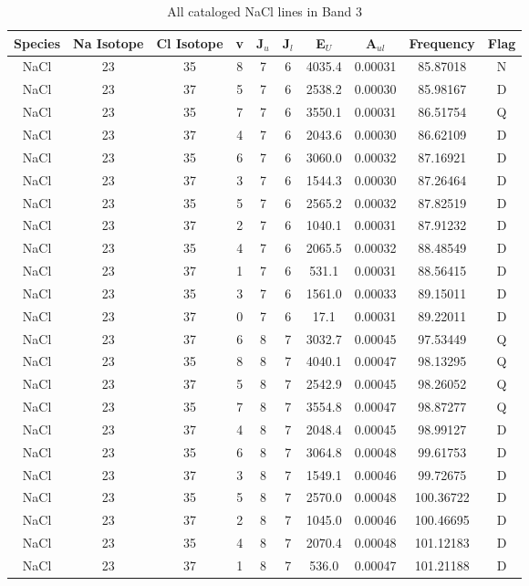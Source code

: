 \begin{table*}[htp]
\centering
\caption{All cataloged NaCl lines in Band 3}
\begin{tabular}{cccccccccc}
\label{tab:Na_detections_B3}
Species & Na Isotope & Cl Isotope & v & J$_u$ & J$_l$ & E$_U$ & A$_{ul}$ & Frequency & Flag \\
\hline
NaCl & 23 & 35 & 8 & 7 & 6 & 4035.4 & 0.00031 & 85.87018 & N \\
NaCl & 23 & 37 & 5 & 7 & 6 & 2538.2 & 0.00030 & 85.98167 & D \\
NaCl & 23 & 35 & 7 & 7 & 6 & 3550.1 & 0.00031 & 86.51754 & Q \\
NaCl & 23 & 37 & 4 & 7 & 6 & 2043.6 & 0.00030 & 86.62109 & D \\
NaCl & 23 & 35 & 6 & 7 & 6 & 3060.0 & 0.00032 & 87.16921 & D \\
NaCl & 23 & 37 & 3 & 7 & 6 & 1544.3 & 0.00030 & 87.26464 & D \\
NaCl & 23 & 35 & 5 & 7 & 6 & 2565.2 & 0.00032 & 87.82519 & D \\
NaCl & 23 & 37 & 2 & 7 & 6 & 1040.1 & 0.00031 & 87.91232 & D \\
NaCl & 23 & 35 & 4 & 7 & 6 & 2065.5 & 0.00032 & 88.48549 & D \\
NaCl & 23 & 37 & 1 & 7 & 6 & 531.1 & 0.00031 & 88.56415 & D \\
NaCl & 23 & 35 & 3 & 7 & 6 & 1561.0 & 0.00033 & 89.15011 & D \\
NaCl & 23 & 37 & 0 & 7 & 6 & 17.1 & 0.00031 & 89.22011 & D \\
NaCl & 23 & 37 & 6 & 8 & 7 & 3032.7 & 0.00045 & 97.53449 & Q \\
NaCl & 23 & 35 & 8 & 8 & 7 & 4040.1 & 0.00047 & 98.13295 & Q \\
NaCl & 23 & 37 & 5 & 8 & 7 & 2542.9 & 0.00045 & 98.26052 & Q \\
NaCl & 23 & 35 & 7 & 8 & 7 & 3554.8 & 0.00047 & 98.87277 & Q \\
NaCl & 23 & 37 & 4 & 8 & 7 & 2048.4 & 0.00045 & 98.99127 & D \\
NaCl & 23 & 35 & 6 & 8 & 7 & 3064.8 & 0.00048 & 99.61753 & D \\
NaCl & 23 & 37 & 3 & 8 & 7 & 1549.1 & 0.00046 & 99.72675 & D \\
NaCl & 23 & 35 & 5 & 8 & 7 & 2570.0 & 0.00048 & 100.36722 & D \\
NaCl & 23 & 37 & 2 & 8 & 7 & 1045.0 & 0.00046 & 100.46695 & D \\
NaCl & 23 & 35 & 4 & 8 & 7 & 2070.4 & 0.00048 & 101.12183 & D \\
NaCl & 23 & 37 & 1 & 8 & 7 & 536.0 & 0.00047 & 101.21188 & D \\
\hline
\end{tabular}

\par 
\end{table*}
